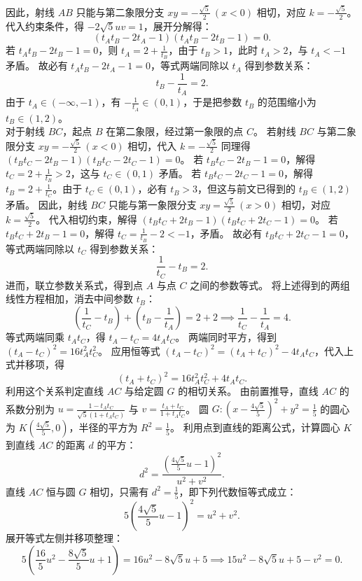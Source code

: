 \begin{solution}
因此，射线 $AB$ 只能与第二象限分支 $xy = -\frac{\sqrt{5}}{2}\ (x<0)$ 相切，对应 $k = -\frac{\sqrt{5}}{2}$。
代入约束条件，得 $-2\sqrt{5}uv = 1$，展开分解得：
\[ (t_A t_B - 2t_A - 1)(t_A t_B - 2t_B - 1) = 0. \]
若 $t_A t_B - 2t_B - 1 = 0$，则 $t_A = 2 + \frac{1}{t_B}$，由于 $t_B>1$，此时 $t_A > 2$，与 $t_A < -1$ 矛盾。
故必有 $t_A t_B - 2t_A - 1 = 0$，等式两端同除以 $t_A$ 得到参数关系：
\[ t_B - \frac{1}{t_A} = 2. \]
由于 $t_A \in (-\infty, -1)$，有 $-\frac{1}{t_A} \in (0, 1)$，于是把参数 $t_B$ 的范围缩小为 $t_B \in (1, 2)$。\\
对于射线 $BC$，起点 $B$ 在第二象限，经过第一象限的点 $C$。
若射线 $BC$ 与第二象限分支 $xy = -\frac{\sqrt{5}}{2}\ (x<0)$ 相切，代入 $k = -\frac{\sqrt{5}}{2}$ 同理得 $(t_B t_C - 2t_B - 1)(t_B t_C - 2t_C - 1) = 0$。
若 $t_B t_C - 2t_B - 1 = 0$，解得 $t_C = 2 + \frac{1}{t_B} > 2$，这与 $t_C \in (0, 1)$ 矛盾。
若 $t_B t_C - 2t_C - 1 = 0$，解得 $t_B = 2 + \frac{1}{t_C}$。由于 $t_C \in (0, 1)$，必有 $t_B > 3$，但这与前文已得到的 $t_B \in (1, 2)$ 矛盾。
因此，射线 $BC$ 只能与第一象限分支 $xy = \frac{\sqrt{5}}{2}\ (x>0)$ 相切，对应 $k = \frac{\sqrt{5}}{2}$。
代入相切约束，解得 $(t_B t_C + 2t_B - 1)(t_B t_C + 2t_C - 1) = 0$。
若 $t_B t_C + 2t_B - 1 = 0$，解得 $t_C = \frac{1}{t_B} - 2 < -1$，矛盾。
故必有 $t_B t_C + 2t_C - 1 = 0$，等式两端同除以 $t_C$ 得到参数关系：
\[ \frac{1}{t_C} - t_B = 2. \]
进而，联立参数关系式，得到点 $A$ 与点 $C$ 之间的参数等式。
将上述得到的两组线性方程相加，消去中间参数 $t_B$：
\[ \left(\frac{1}{t_C} - t_B\right) + \left(t_B - \frac{1}{t_A}\right) = 2 + 2 \implies \frac{1}{t_C} - \frac{1}{t_A} = 4. \]
等式两端同乘 $t_A t_C$，得 $t_A - t_C = 4t_A t_C$。
两端同时平方，得到 $(t_A - t_C)^2 = 16t_A^2 t_C^2$。
应用恒等式 $(t_A - t_C)^2 = (t_A + t_C)^2 - 4t_A t_C$，代入上式并移项，得
\[ (t_A + t_C)^2 = 16t_A^2 t_C^2 + 4t_A t_C. \]
利用这个关系判定直线 $AC$ 与给定圆 $G$ 的相切关系。
由前置推导，直线 $AC$ 的系数分别为 $u = \frac{1-t_A t_C}{\sqrt{5}(1+t_A t_C)}$ 与 $v = \frac{t_A+t_C}{1+t_A t_C}$。
圆 $G: \left(x - \frac{4\sqrt{5}}{5}\right)^2 + y^2 = \frac{1}{5}$ 的圆心为 $K\left(\frac{4\sqrt{5}}{5}, 0\right)$，半径的平方为 $R^2 = \frac{1}{5}$。
利用点到直线的距离公式，计算圆心 $K$ 到直线 $AC$ 的距离 $d$ 的平方：
\[ d^2 = \frac{\left( \frac{4\sqrt{5}}{5} u - 1 \right)^2}{u^2 + v^2}. \]
直线 $AC$ 恒与圆 $G$ 相切，只需有 $d^2 = \frac{1}{5}$，即下列代数恒等式成立：
\[ 5 \left( \frac{4\sqrt{5}}{5} u - 1 \right)^2 = u^2 + v^2. \]
展开等式左侧并移项整理：
\[ 5 \left( \frac{16}{5} u^2 - \frac{8\sqrt{5}}{5} u + 1 \right) = 16 u^2 - 8\sqrt{5} u + 5 \implies 15 u^2 - 8\sqrt{5} u + 5 - v^2 = 0. \]

\end{solution}
